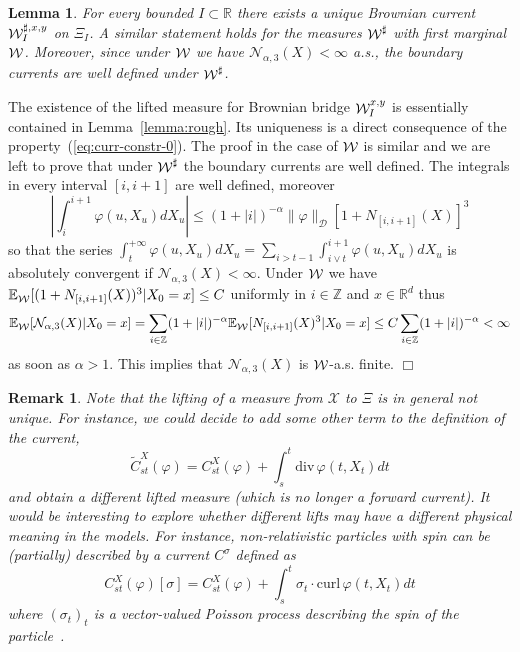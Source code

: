 \documentclass[a4paper,11pt]{article}
\newtheorem{lemma}[theorem]{Lemma}
\newtheorem{remark}[theorem]{Remark}
\newenvironment{proof}[1][Proof]{{\sc #1.} }{\hfill $\Box$}
\newcommand{\expect}{\mathbb{E}}
\newcommand{\R}{\mathbb{R}}
\newcommand{\W}{\mathop{\mathrm{{\cal W}}}\nolimits}
\newcommand{\X}{\mathcal{X}}
\newcommand {\Z} {\mathbb{Z}}
\begin{document}
\begin{lemma}
\label{lemma:W-lift}
For every bounded $I \subset \R $ there exists a unique Brownian
current $\W^{\sharp,x,y}_I$ on $\Xi_I$. A similar statement holds for
the measures $\W^\sharp$ with first marginal $\W$. Moreover, since
under $\W$ we have  $\mathcal{N}_{\alpha,3}(X) < \infty$ a.s., the
boundary currents are well defined under $\W^\sharp$.
\end{lemma}
\begin{proof}
The existence of the lifted measure for Brownian bridge $\W^{x,y}_I$ 
is essentially contained in Lemma~\ref{lemma:rough}. Its uniqueness 
is a direct consequence of the property~(\ref{eq:curr-constr-0}). 
The proof in the case of $\W$ is similar and we are left to prove that
under $\W^\sharp$ the boundary currents are well defined. The integrals 
in every interval $[i,i+1]$ are well defined, moreover
$$
\left|\int_{i}^{i+1}  \varphi(u,X_u) dX_u\right|\le (1+|i|)^{-\alpha} 
\|\varphi\|_{\mathcal D} [1+N_{[i,i+1]}(X)]^3  
$$
so that the series
$
\int_{t}^{+\infty}\varphi(u,X_u) dX_u =   
\sum_{i>t-1}\int_{i\vee t}^{i+1}  \varphi(u,X_u) dX_u
$
is absolutely convergent if $\mathcal{N}_{\alpha,3}(X) < \infty$.
Under $\W$ we have
$
\expect_{\W} [(1+N_{[i,i+1]}(X))^3|X_0=x] \le C
$ 
uniformly in $i \in \Z$ and $x\in \R^d$ thus
$$
\expect_{\W} [\mathcal{N}_{\alpha,3}(X)|X_0=x]  = 
\sum_{i \in \Z}(1+|i|)^{-\alpha} 
\expect_{\W} [N_{[i,i+1]}(X)^3|X_0=x] 
\le 
C  \sum_{i \in \Z} (1+|i|)^{-\alpha} < \infty
$$
as soon as $\alpha > 1$. This implies that $\mathcal{N}_{\alpha,3}(X)$
is $\W$-a.s. finite.
\end{proof}


\begin{remark}
\rm{
Note that the lifting of a measure from $\X$ to $\Xi$ is in general 
not unique. For instance, we could decide to add some other term to 
the definition of the current,
$$
\tilde C_{st}^X(\varphi) = C_{st}^X(\varphi) + \int_s^t \mathrm{div}\,
\varphi(t, X_t) dt
$$
and obtain a different lifted measure (which is no longer a forward 
current). It would be interesting to explore whether different lifts 
may have a different physical meaning in the models. For instance, 
non-relativistic particles with spin can be (partially) described by 
a current $C^\sigma$ defined as
$$
C^X_{st}(\varphi)[\sigma] = C_{st}^X(\varphi) + \int_s^t \sigma_t 
\cdot \mathrm{curl}\, \varphi(t, X_t) dt
$$
where $(\sigma_t)_t$ is a vector-valued Poisson process describing
the spin of the particle~\cite{Jona,Jona2,HL1}.  
}
\end{remark}
\end{document}

